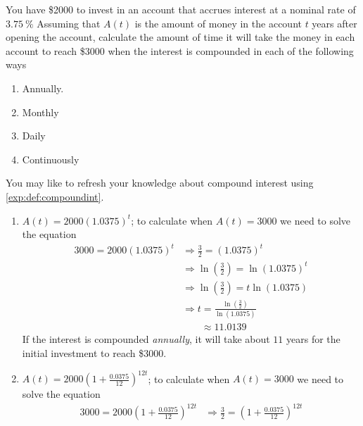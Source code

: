 \begin{pccexample}
	You have \$2000 to invest in an account that accrues interest at a nominal rate of $\SI{3.75}{\percent}$
	Assuming that $A(t)$ is the amount of money in the account $t$ years 
	after opening the account, calculate the amount of time it will take 
	the money in each account to reach \$3000 when the interest is 
	compounded in each of the following ways
	\begin{multicols}{4}
		\begin{enumerate}
			\item Annually. 
			\item Monthly 
			\item Daily 
			\item Continuously 
		\end{enumerate}
	\end{multicols}
	You may like to refresh your knowledge about compound interest using \vref{exp:def:compoundint}.
	\begin{pccsolution}
		\begin{enumerate}
			\item $A(t)=2000(1.0375)^t$; to calculate when $A(t)=3000$ we need to solve the 
			equation
			\begin{align*}
				3000=2000(1.0375)^t & \Rightarrow \frac{3}{2}=(1.0375)^t                              \\
				                    & \Rightarrow \ln\left( \frac{3}{2} \right)=\ln(1.0375)^t         \\
				                    & \Rightarrow \ln\left( \frac{3}{2} \right)=t\ln(1.0375)          \\
				                    & \Rightarrow t=\frac{\ln\left( \frac{3}{2} \right)}{\ln(1.0375)} \\
				                    & \phantom{ {}\Rightarrow t}\approx 11.0139                       
			\end{align*}
			If the interest is compounded \emph{annually}, it will take about $11$ years for the 
			initial investment to reach \$3000.
			\item $A(t)=2000\left( 1+\frac{0.0375}{12} \right)^{12t}$; to calculate when $A(t)=3000$ we need to solve the 
			equation
			\begin{align*}
				3000=2000\left( 1+\frac{0.0375}{12} \right)^{12t} & \Rightarrow \frac{3}{2}=\left( 1+\frac{0.0375}{12} \right)^{12t}                                           \\

\end{align*}
\end{enumerate}
\end{pccsolution}
\end{pccexample}
